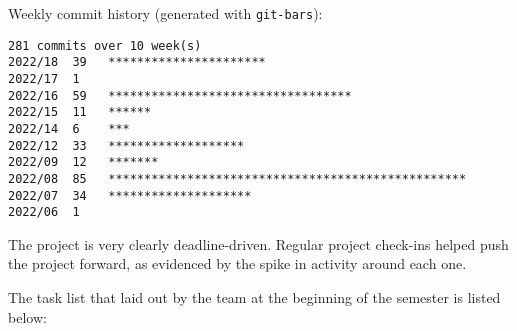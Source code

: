 Weekly commit history (generated with \verb|git-bars|):
{\small
\begin{verbatim}
281 commits over 10 week(s)
2022/18  39   **********************
2022/17  1    
2022/16  59   **********************************
2022/15  11   ******
2022/14  6    ***
2022/12  33   *******************
2022/09  12   *******
2022/08  85   **************************************************
2022/07  34   ********************
2022/06  1    
\end{verbatim}
}

The project is very clearly deadline-driven. Regular project check-ins
helped push the project forward, as evidenced by the spike in activity around each one.

The task list that laid out by the team at the beginning of the semester is listed below:

